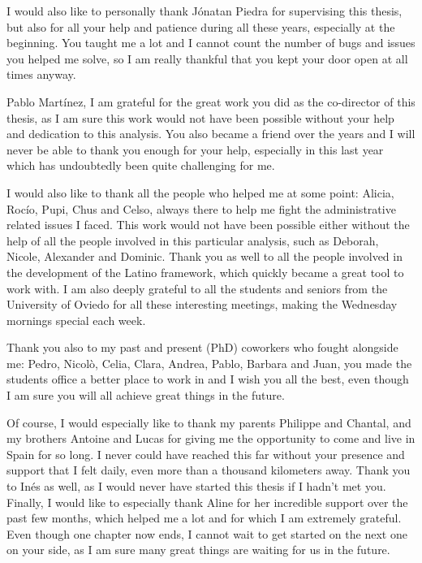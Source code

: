 \documentclass[a4paper, 10pt, openright]{report}
\begin{document}
I would also like to personally thank J\'{o}natan Piedra for supervising this thesis, but also for all your help and patience during all these years, especially at the beginning. You taught me a lot and I cannot count the number of bugs and issues you helped me solve, so I am really thankful that you kept your door open at all times anyway.

Pablo Mart\'{i}nez, I am grateful for the great work you did as the co-director of this thesis, as I am sure this work would not have been possible without your help and dedication to this analysis. You also became a friend over the years and I will never be able to thank you enough for your help, especially in this last year which has undoubtedly been quite challenging for me. 

I would also like to thank all the people who helped me at some point: Alicia, Roc\'{i}o, Pupi, Chus and Celso, always there to help me fight the administrative related issues I faced. This work would not have been possible either without the help of all the people involved in this particular analysis, such as Deborah, Nicole, Alexander and Dominic. Thank you as well to all the people involved in the development of the Latino framework, which quickly became a great tool to work with. I am also deeply grateful to all the students and seniors from the University of Oviedo for all these interesting meetings, making the Wednesday mornings special each week. 

Thank you also to my past and present (PhD) coworkers who fought alongside me: Pedro, Nicol\`{o}, Celia, Clara, Andrea, Pablo, Barbara and Juan, you made the students office a better place to work in and I wish you all the best, even though I am sure you will all achieve great things in the future.

Of course, I would especially like to thank my parents Philippe and Chantal, and my brothers Antoine and Lucas for giving me the opportunity to come and live in Spain for so long. I never could have reached this far without your presence and support that I felt daily, even more than a thousand kilometers away. Thank you to In\'{e}s as well, as I would never have started this thesis if I hadn't met you. Finally, I would like to especially thank Aline for her incredible support over the past few months, which helped me a lot and for which I am extremely grateful. Even though one chapter now ends, I cannot wait to get started on the next one on your side, as I am sure many great things are waiting for us in the future.
\end{document}
